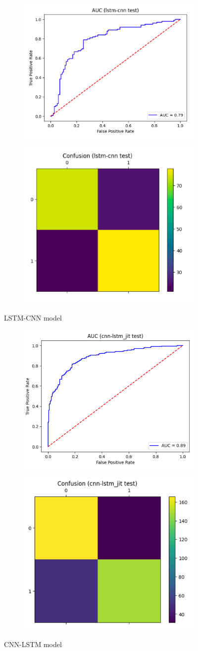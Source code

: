 \documentclass[format=sigconf, nonacm=true, review=true, screen=true]{acmart}
\begin{document}
\begin{figure}[H]
     \centering
     \begin{subfigure}
         \centering
         \includegraphics[width=0.24\columnwidth]{figures/lstm-cnn-roc.png}
     \end{subfigure}
     \begin{subfigure}
         \centering
         \includegraphics[width=0.24\columnwidth]{figures/lstm-cnn-cm.png}
     \end{subfigure}
     \caption{LSTM-CNN model}
     \label{fig:lstm-cnn-roc-cm}

     \centering
     \begin{subfigure}
         \centering
         \includegraphics[width=0.24\columnwidth]{figures/cnn-lstm-roc.png}
     \end{subfigure}
     \begin{subfigure}
         \centering
         \includegraphics[width=0.24\columnwidth]{figures/cnn-lstm-cm.png}
     \end{subfigure}
     \caption{CNN-LSTM model}
     \label{fig:cnn-lstm-roc-cm}
 \end{figure}
\end{document}
